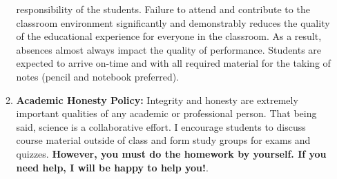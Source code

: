 \documentclass[10pt]{article}
\begin{document}
\begin{enumerate}
\begin{enumerate}[label=\alph*.]
           responsibility of the students. Failure to
           attend and contribute to the classroom environment
           significantly and demonstrably reduces the quality of the
           educational experience for everyone in the classroom. As a
           result, absences almost always impact the quality of
           performance.  Students are expected to arrive on-time and
           with all required material for the taking of notes (pencil
           and notebook preferred).
         \item {\bf Academic Honesty Policy:}
           Integrity and honesty are extremely important qualities of
           any academic or professional person.  That being said,
           science is a collaborative effort. I encourage students to
           discuss course material outside of class and form study
           groups for exams and quizzes. {\bf However, you must do the
           homework by yourself. If you need help, I will be happy to
           help you!}. 
           \\\\

\end{enumerate}
\end{enumerate}
\end{document}
